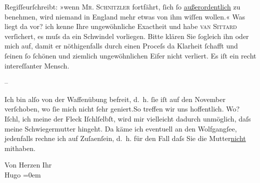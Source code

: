                   Regiſſeurſchreibt: »wenn \textsc{Mr.
                  Schnitzler} fortfährt, ſich ſo \uline{außerordentlich}
               zu benehmen, wird niemand in England mehr etwas
               von ihm wiſſen {\pb}wollen.« Was liegt
               da vor? ich kenne Ihre ungewöhnliche Exactheit und habe \textsc{van Sittard} verſichert, es muſs da ein Schwindel vorliegen. Bitte klären Sie ſogleich ihn
               oder mich auf, damit er nöthigenfalls durch einen Proceſs da Klarheit ſchafft und
               ſeinen ſo ſchönen und ziemlich ungewöhnlichen Eifer nicht verliert. Es iſt ein recht
               intereſſanter Mensch.\pend
           
\pstart
           \centering{}{\pb}–\pend
           
\pstart
           Ich bin alſo von der Waffenübung befreit, d. h. ſie iſt auf den November
               verſchoben, wo ſie mich nicht ſehr geniert.\hspace*{1.5em}So
               treffen wir uns hoffentlich. Wo? Iſchl, ich meine
               der Fleck Iſchlſelbſt, wird mir vielleicht dadurch unmöglich, daſs
               meine Schwiegermutter
               hingeht. Da käme ich eventuell an den Wolfgangſee, jedenfalls rechne ich auf Zuſa{\geminationm}enſein, d. h. für den Fall daſs Sie die Mutter\uline{nicht} mithaben.\pend
           
\pstart
           Von Herzen Ihr{\\[\baselineskip]}\spacefill\mbox{Hugo}\pend
           \leftskip=0em{}\endnumbering{}  
      